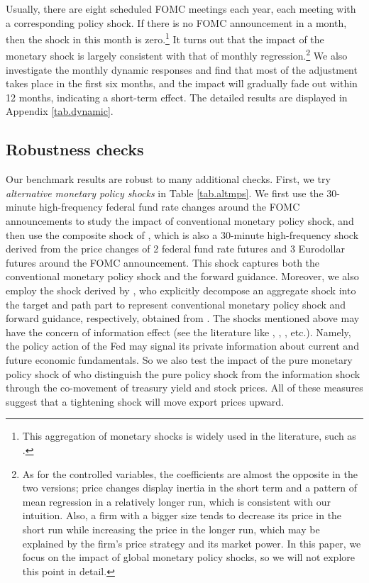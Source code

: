 Usually, there are eight scheduled FOMC meetings each year, each meeting with a corresponding policy shock. If there is no FOMC announcement in a month, then the shock in this month is zero.\footnote{This aggregation of monetary shocks is widely used in the literature, such as \cite{chari2021Taper}.} It turns out that the impact of the monetary shock is largely consistent with that of monthly regression.\footnote{As for the controlled variables, the coefficients are almost the opposite in the two versions; price changes display inertia in the short term and a pattern of mean regression in a relatively longer run, which is consistent with our intuition. Also, a firm with a bigger size tends to decrease its price in the short run while increasing the price in the longer run, which may be explained by the firm's price strategy and its market power. In this paper, we focus on the impact of global monetary policy shocks, so we will not explore this point in detail.} We also investigate the monthly dynamic responses and find that most of the adjustment takes place in the first six months, and the impact will gradually fade out within 12 months, indicating a short-term effect. The detailed results are displayed in Appendix \ref{tab.dynamic}.

\subsection{Robustness checks}

Our benchmark results are robust to many additional checks. First, we try \textit{alternative monetary policy shocks} in Table \ref{tab.altmps}. We first use the 30-minute high-frequency federal fund rate changes around the FOMC announcements to study the impact of conventional monetary policy shock, and then use the composite shock of \cite{nakamura2018high}, which is also a 30-minute high-frequency shock derived from the price changes of 2 federal fund rate futures and 3 Eurodollar futures around the FOMC announcement. This shock captures both the conventional monetary policy shock and the forward guidance. Moreover, we also employ the shock derived by \cite{guraynak2005actions}, who explicitly decompose an aggregate shock into the target and path part to represent conventional monetary policy shock and forward guidance, respectively, obtained from \cite{acosta2022perceived}. The shocks mentioned above may have the concern of information effect (see the literature like \cite{nakamura2018high}, \cite{jarocinski2020deconstructing}, \cite{acosta2022perceived}, etc.). Namely, the policy action of the Fed may signal its private information about current and future economic fundamentals. So we also test the impact of the pure monetary policy shock of \cite{jarocinski2020deconstructing} who distinguish the pure policy shock from the information shock through the co-movement of treasury yield and stock prices. All of these measures suggest that a tightening shock will move export prices upward.

